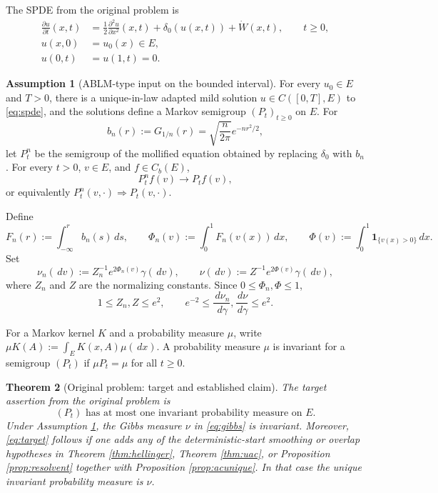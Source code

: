 \documentclass[12pt]{article}
\newcommand{\1}{\mathbf 1}
\newcommand{\dd}{\,d}
\theoremstyle{plain}
\newtheorem{theorem}{Theorem}[section]
\theoremstyle{definition}
\newtheorem{assumption}[theorem]{Assumption}
\theoremstyle{remark}
\numberwithin{equation}{section}
\begin{document}
The SPDE from the original problem is
\begin{align}
\tag{\(*\)}\label{eq:spde}
\frac{\partial u}{\partial t}(x,t)
&=\frac12\frac{\partial^2u}{\partial x^2}(x,t)
+\delta_0(u(x,t))+\dot W(x,t),\qquad t\ge0,\\
u(x,0)&=u_0(x)\in E,\nonumber\\
u(0,t)&=u(1,t)=0.\nonumber
\end{align}

\begin{assumption}[ABLM-type input on the bounded interval]\label{ass:ablm}
For every \(u_0\in E\) and \(T>0\), there is a unique-in-law adapted mild
solution \(u\in C([0,T],E)\) to \eqref{eq:spde}, and the solutions define a
Markov semigroup \((P_t)_{t\ge0}\) on \(E\).  For
\[
b_n(r):=G_{1/n}(r)=\sqrt{\frac n{2\pi}}e^{-nr^2/2},
\]
let \(P_t^n\) be the semigroup of the mollified equation obtained by replacing
\(\delta_0\) with \(b_n\).  For every \(t>0\), \(v\in E\), and \(f\in C_b(E)\),
\[
P_t^n f(v)\longrightarrow P_tf(v),
\]
or equivalently \(P_t^n(v,\cdot)\Rightarrow P_t(v,\cdot)\).
\end{assumption}

Define
\[
F_n(r):=\int_{-\infty}^r b_n(s)\dd s,\qquad
\Phi_n(v):=\int_0^1F_n(v(x))\dd x,\qquad
\Phi(v):=\int_0^1\1_{\{v(x)>0\}}\dd x.
\]
Set
\begin{equation}\label{eq:gibbs}
\nu_n(\dd v):=Z_n^{-1}e^{2\Phi_n(v)}\gamma(\dd v),
\qquad
\nu(\dd v):=Z^{-1}e^{2\Phi(v)}\gamma(\dd v),
\end{equation}
where \(Z_n\) and \(Z\) are the normalizing constants.  Since
\(0\le\Phi_n,\Phi\le1\),
\begin{equation}\label{eq:density-bounds}
1\le Z_n,Z\le e^2,
\qquad
e^{-2}\le \frac{\dd\nu_n}{\dd\gamma},\frac{\dd\nu}{\dd\gamma}\le e^2.
\end{equation}

For a Markov kernel \(K\) and a probability measure \(\mu\), write
\(\mu K(A):=\int_EK(x,A)\mu(\dd x)\).  A probability measure \(\mu\) is invariant
for a semigroup \((P_t)\) if \(\mu P_t=\mu\) for all \(t\ge0\).

\begin{theorem}[Original problem: target and established claim]\label{thm:headline}
The target assertion from the original problem is
\[
\tag{U}\label{eq:target}
\text{\((P_t)\) has at most one invariant probability measure on \(E\).}
\]
Under Assumption \ref{ass:ablm}, the Gibbs measure \(\nu\) in
\eqref{eq:gibbs} is invariant.  Moreover, \eqref{eq:target} follows if one adds
any of the deterministic-start smoothing or overlap hypotheses in Theorem
\ref{thm:hellinger}, Theorem \ref{thm:uac}, or Proposition
\ref{prop:resolvent} together with Proposition \ref{prop:acunique}.  In that
case the unique invariant probability measure is \(\nu\).
\end{theorem}
\end{document}
